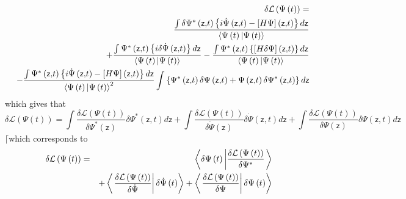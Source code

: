 \documentclass[aps,preprint]{revtex4}
\begin{document}
\begin{eqnarray}
&&\delta \mathcal{L}\left( \Psi \left( t\right) \right) =  \notag \\
&&\frac{\int \delta \Psi ^{\ast }\left( \mathsf{z,}t\right) \left\{ i\dot{%
\Psi}\left( \mathsf{z,}t\right) -\left[ H\Psi \right] \left( \mathsf{z,}%
t\right) \right\} d\mathsf{z}}{\left\langle \Psi \left( t\right) |\Psi
\left( t\right) \right\rangle }  \notag \\
&&+\frac{\int \Psi ^{\ast }\left( \mathsf{z,}t\right) \left\{ i\delta \dot{%
\Psi}\left( \mathsf{z,}t\right) \right\} d\mathsf{z}}{\left\langle \Psi
\left( t\right) |\Psi \left( t\right) \right\rangle }-\frac{\int \Psi ^{\ast
}\left( \mathsf{z,}t\right) \left\{ \left[ H\delta \Psi \right] \left( 
\mathsf{z,}t\right) \right\} d\mathsf{z}}{\left\langle \Psi \left( t\right)
|\Psi \left( t\right) \right\rangle }  \notag \\
&&-\frac{\int \Psi ^{\ast }\left( \mathsf{z,}t\right) \left\{ i\dot{\Psi}%
\left( \mathsf{z,}t\right) -\left[ H\Psi \right] \left( \mathsf{z,}t\right)
\right\} d\mathsf{z}}{\left\langle \Psi \left( t\right) |\Psi \left(
t\right) \right\rangle ^{2}}\int \left\{ \Psi ^{\ast }\left( \mathsf{z,}%
t\right) \delta \Psi \left( \mathsf{z,}t\right) +\Psi \left( \mathsf{z,}%
t\right) \delta \Psi ^{\ast }\left( \mathsf{z,}t\right) \right\} d\mathsf{z}
\end{eqnarray}%
which gives that 
\begin{equation}
\delta \mathcal{L}\left( \Psi \left( t\right) \right) =\int \frac{\delta 
\mathcal{L}\left( \Psi \left( t\right) \right) }{\delta \Psi ^{\ast }\left( 
\mathsf{z}\right) }\delta \Psi ^{\ast }\left( \mathsf{z,}t\right) d\mathsf{z}%
+\int \frac{\delta \mathcal{L}\left( \Psi \left( t\right) \right) }{\delta 
\dot{\Psi}\left( \mathsf{z}\right) }\delta \dot{\Psi}\left( \mathsf{z,}%
t\right) d\mathsf{z}+\int \frac{\delta \mathcal{L}\left( \Psi \left(
t\right) \right) }{\delta \Psi \left( \mathsf{z}\right) }\delta \Psi \left( 
\mathsf{z,}t\right) d\mathsf{z}  \label{var1}
\end{equation}%
$\lceil $which corresponds to 
\begin{eqnarray}
\delta \mathcal{L}\left( \Psi \left( t\right) \right) &=&\left\langle \delta
\Psi \left( t\right) \left| \frac{\delta \mathcal{L}\left( \Psi \left(
t\right) \right) }{\delta \Psi ^{\ast }}\right. \right\rangle  \notag \\
&&+\left\langle \left. \frac{\delta \mathcal{L}\left( \Psi \left( t\right)
\right) }{\delta \dot{\Psi}}\right| \delta \dot{\Psi}\left( t\right)
\right\rangle +\left\langle \left. \frac{\delta \mathcal{L}\left( \Psi
\left( t\right) \right) }{\delta \Psi }\right| \delta \Psi \left( t\right)
\right\rangle
\end{eqnarray}%
\end{document}

